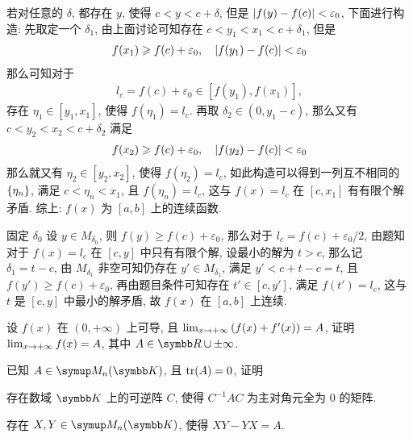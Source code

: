 \documentclass{ctexart}
\begin{document}
\begin{exercise}[series=exer]
\begin{answer}
\begin{method}
            若对任意的 $ \delta $, 都存在 $ y $, 使得 $ c < y < c + \delta $, 但是 $ \abs{f(y) - f(c)} < \varepsilon_{0} $, 下面进行构造: 先取定一个 $ \delta_{1} $, 由上面讨论可知存在 $ c < y_{1} < x_{1} < c + \delta_{1}  $, 但是
            \begin{align*}
                f(x_{1}) \geqslant f(c) + \varepsilon_{0}, \quad \abs{f(y_{1}) - f(c)} < \varepsilon_{0}
            \end{align*}
            那么可知对于
            \begin{align*}
                l_{c} = f(c) + \varepsilon_{0} \in [f(y_{1}), f(x_{1})],
            \end{align*}
            存在 $ \eta_{1} \in [y_{1}, x_{1}] $, 使得 $ f(\eta_{1}) = l_{c} $. 再取 $ \delta_{2} \in (0, y_{1} - c) $, 那么又有 $ c < y_{2} < x_{2} < c + \delta_{2} $ 满足
            \begin{align*}
                f(x_{2}) \geqslant f(c) + \varepsilon_{0}, \quad \abs{f(y_{2}) - f(c)} < \varepsilon_{0}
            \end{align*}
            那么就又有 $ \eta_{2} \in [y_{2}, x_{2}] $, 使得 $ f(\eta_{2}) = l_{c} $, 如此构造可以得到一列互不相同的 $ \qty{\eta_{n}} $, 满足 $ c < \eta_{n} < x_{1} $, 且 $ f(\eta_{n}) = l_{c} $, 这与 $ f(x) = l_{c} $ 在 $ [c, x_{1}] $ 有有限个解矛盾. 综上: $ f(x) $ 为 $ [a, b] $ 上的连续函数.
            \item 固定 $ \delta_{0} $ 设 $ y \in M_{\delta_{0}} $, 则 $ f(y) \ge f(c) + \varepsilon_{0} $, 那么对于 $ l_{c} = f(c) + \varepsilon_{0}/2 $, 由题知对于 $ f(x) = l_{c} $ 在 $ [c, y] $ 中只有有限个解, 设最小的解为 $ t > c $, 那么记 $ \delta_{1} = t - c $, 由 $ M_{\delta_{1}} $ 非空可知仍存在 $ y' \in M_{\delta_{1}} $, 满足 $ y' < c + t - c = t $, 且 $ f(y') \ge f(c) + \varepsilon_{0} $, 再由题目条件可知存在 $ t' \in [c, y'] $, 满足 $ f(t') = l_{c} $, 这与 $ t $ 是 $ [c, y] $ 中最小的解矛盾, 故 $ f(x) $ 在 $ [a, b] $ 上连续. 
        \end{method}
    \end{answer}
    \item 设 $ f(x) $ 在 $ (0, +\infty) $ 上可导, 且 $ \lim_{x \to +\infty} \qty(f(x) + f'(x)) = A $, 证明 $ \lim_{x \to +\infty} f(x) = A $, 其中 $ A \in \R\cup{\pm\infty} $. 
    \item 已知 $ A \in \MM[\K] $, 且 $ \tr(A) = 0 $, 证明
    \begin{exercise}
        \item 存在数域 $ \K $ 上的可逆阵 $ C $, 使得 $ C^{-1}AC $ 为主对角元全为 $ 0 $ 的矩阵.
        \item 存在 $ X, Y \in \MM[\K] $, 使得 $ XY - YX = A $.

\end{exercise}
\end{exercise}
\end{document}

